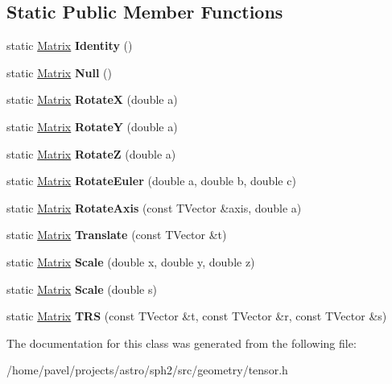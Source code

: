 \subsection*{Static Public Member Functions}
\begin{DoxyCompactItemize}
\item 
\hypertarget{classMatrix_a71946b221577fae7a86177bca76d9d96}{}\label{classMatrix_a71946b221577fae7a86177bca76d9d96} 
static \hyperlink{classMatrix}{Matrix} {\bfseries Identity} ()
\item 
\hypertarget{classMatrix_aee442afe6336844ea24a0a9d1c4a70b4}{}\label{classMatrix_aee442afe6336844ea24a0a9d1c4a70b4} 
static \hyperlink{classMatrix}{Matrix} {\bfseries Null} ()
\item 
\hypertarget{classMatrix_ae92199d7a89aad1f3f501a75ed668392}{}\label{classMatrix_ae92199d7a89aad1f3f501a75ed668392} 
static \hyperlink{classMatrix}{Matrix} {\bfseries RotateX} (double a)
\item 
\hypertarget{classMatrix_a6c1deaa568066a0a058c2120701ca661}{}\label{classMatrix_a6c1deaa568066a0a058c2120701ca661} 
static \hyperlink{classMatrix}{Matrix} {\bfseries RotateY} (double a)
\item 
\hypertarget{classMatrix_ab7d522fde5f8c5060898456aa1caf496}{}\label{classMatrix_ab7d522fde5f8c5060898456aa1caf496} 
static \hyperlink{classMatrix}{Matrix} {\bfseries RotateZ} (double a)
\item 
\hypertarget{classMatrix_a28fcbc2c17a3f1192c1d057dce01f8a6}{}\label{classMatrix_a28fcbc2c17a3f1192c1d057dce01f8a6} 
static \hyperlink{classMatrix}{Matrix} {\bfseries Rotate\+Euler} (double a, double b, double c)
\item 
\hypertarget{classMatrix_ac04a830d4b99b478088812ba0ee3cd57}{}\label{classMatrix_ac04a830d4b99b478088812ba0ee3cd57} 
static \hyperlink{classMatrix}{Matrix} {\bfseries Rotate\+Axis} (const T\+Vector \&axis, double a)
\item 
\hypertarget{classMatrix_a6d94a46039304c204ff501a3cbd94892}{}\label{classMatrix_a6d94a46039304c204ff501a3cbd94892} 
static \hyperlink{classMatrix}{Matrix} {\bfseries Translate} (const T\+Vector \&t)
\item 
\hypertarget{classMatrix_a9e247a9f062fb569f497aaf5615a8da0}{}\label{classMatrix_a9e247a9f062fb569f497aaf5615a8da0} 
static \hyperlink{classMatrix}{Matrix} {\bfseries Scale} (double x, double y, double z)
\item 
\hypertarget{classMatrix_aee12e50e8a87b6bcdc0acdfc8ad42695}{}\label{classMatrix_aee12e50e8a87b6bcdc0acdfc8ad42695} 
static \hyperlink{classMatrix}{Matrix} {\bfseries Scale} (double s)
\item 
\hypertarget{classMatrix_a2f65f62ed9ebe96aa92ef9ce45045e6e}{}\label{classMatrix_a2f65f62ed9ebe96aa92ef9ce45045e6e} 
static \hyperlink{classMatrix}{Matrix} {\bfseries T\+RS} (const T\+Vector \&t, const T\+Vector \&r, const T\+Vector \&s)
\end{DoxyCompactItemize}


The documentation for this class was generated from the following file\+:\begin{DoxyCompactItemize}
\item 
/home/pavel/projects/astro/sph2/src/geometry/tensor.\+h\end{DoxyCompactItemize}
